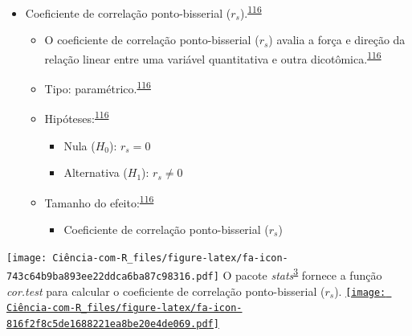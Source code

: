 \documentclass[
]{book}
\providecommand{\tightlist}{%
  \setlength{\itemsep}{0pt}\setlength{\parskip}{0pt}}
\begin{document}
\begin{itemize}
\item
  Coeficiente de correlação ponto-bisserial (\(r_{s}\)).\textsuperscript{\protect\hyperlink{ref-khamis2008}{116}}

  \begin{itemize}
  \item
    O coeficiente de correlação ponto-bisserial (\(r_{s}\)) avalia a força e direção da relação linear entre uma variável quantitativa e outra dicotômica.\textsuperscript{\protect\hyperlink{ref-khamis2008}{116}}
  \item
    Tipo: paramétrico.\textsuperscript{\protect\hyperlink{ref-khamis2008}{116}}
  \item
    Hipóteses:\textsuperscript{\protect\hyperlink{ref-khamis2008}{116}}

    \begin{itemize}
    \item
      Nula (\(H_{0}\)): \(r_{s}=0\)
    \item
      Alternativa (\(H_{1}\)): \(r_{s}≠0\)
    \end{itemize}
  \item
    Tamanho do efeito:\textsuperscript{\protect\hyperlink{ref-khamis2008}{116}}

    \begin{itemize}
    \tightlist
    \item
      Coeficiente de correlação ponto-bisserial (\(r_{s}\))
    \end{itemize}
  \end{itemize}
\end{itemize}

\texttt{[image: Ciência-com-R\_files/figure-latex/fa-icon-743c64b9ba893ee22ddca6ba87c98316.pdf]} O pacote \emph{stats}\textsuperscript{\protect\hyperlink{ref-stats-2}{3}} fornece a função \emph{cor.test} para calcular o coeficiente de correlação ponto-bisserial (\(r_{s}\)). \href{https://rdocumentation.org/packages/stats/versions/3.6.2}{\texttt{[image: Ciência-com-R\_files/figure-latex/fa-icon-816f2f8c5de1688221ea8be20e4de069.pdf]}}
\end{document}
